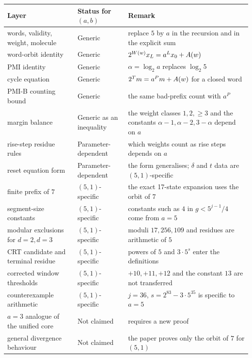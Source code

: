 \begin{center}
\scriptsize
\begin{tabular}{@{}p{}p{}p{}@{}}
\toprule
Layer & Status for $(a,b)$ & Remark \\
\midrule
words, validity, weight, molecule &
  Generic &
  replace $5$ by $a$ in the recursion and in the explicit sum \\
word-orbit identity &
  Generic &
  $2^{W(w)}x_L=a^Lx_0+A(w)$ \\
PMI identity &
  Generic &
  $\alpha=\log_2 a$ replaces $\log_2 5$ \\
cycle equation &
  Generic &
  $2^Tm=a^Pm+A(w)$ for a closed word \\
PMI-B counting bound &
  Generic &
  the same bad-prefix count with $a^P$ \\
margin balance &
  Generic as an inequality &
  the weight classes $1,2,\ge3$ and the constants
  $\alpha-1,\alpha-2,3-\alpha$ depend on $a$ \\
rise-step residue rules &
  Parameter-dependent &
  which weights count as rise steps depends on $a$ \\
reset equation form &
  Parameter-dependent &
  the form generalises; $\delta$ and $t$ data are $(5,1)$-specific \\
finite prefix of $7$ &
  $(5,1)$-specific &
  the exact 17-state expansion uses the orbit of $7$ \\
segment-size constants &
  $(5,1)$-specific &
  constants such as $4$ in $g<5^{j-1}/4$ come from $a=5$ \\
modular exclusions for $d=2,d=3$ &
  $(5,1)$-specific &
  moduli $17,256,109$ and residues are arithmetic of $5$ \\
CRT candidate and terminal residue &
  $(5,1)$-specific &
  powers of $5$ and $3\cdot5^s$ enter the definitions \\
corrected window thresholds &
  $(5,1)$-specific &
  $+10,+11,+12$ and the constant $13$ are not transferred \\
counterexample arithmetic &
  $(5,1)$-specific &
  $j=36$, $s=2^{83}-3\cdot5^{35}$ is specific to $a=5$ \\
$a=3$ analogue of the unified core &
  Not claimed &
  requires a new proof \\
general divergence behaviour &
  Not claimed &
  the paper proves only the orbit of $7$ for $(5,1)$ \\
\bottomrule
\end{tabular}
\end{center}

